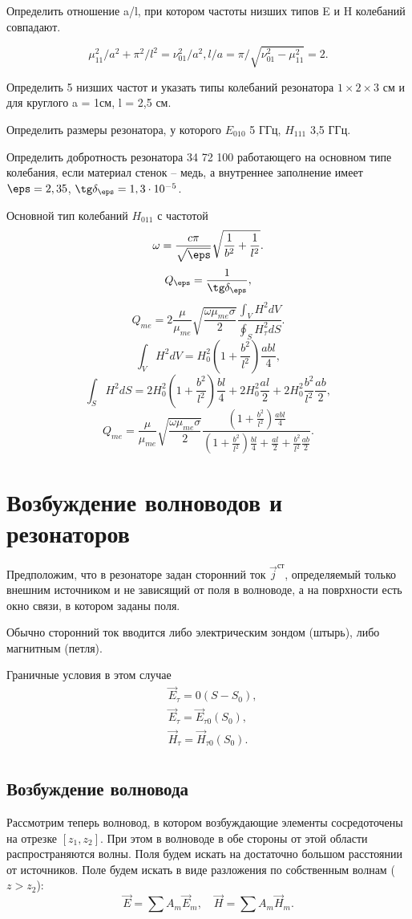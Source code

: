 Определить отношение a/l, при котором частоты низших типов E и H колебаний совпадают.

\[
	\mu_{11}^2/a^2 + \pi^2/l^2 = \nu_{01}^2/a^2, l/a = \pi/\sqrt{\nu_{01}^2 - \mu_{11}^2} = 2.
\]

Определить 5 низших частот и указать типы колебаний резонатора \(1\times2\times3\) см и для круглого a = 1см, l = 2,5 см.

Определить размеры резонатора, у которого \(E_{010}\) 5 ГГц, \(H_{111}\) 3,5 ГГц.

Определить добротность резонатора 34 72 100 работающего на основном типе колебания, если материал стенок -- медь, а внутреннее заполнение имеет \(\eps = 2,35\), \(\tg\delta_\eps = 1,3\cdot10^{-5}\).

Основной тип колебаний \( H_{011} \) с частотой
\[
	\omega = \frac{c\pi}{\sqrt{\eps}}\sqrt{\frac{1}{b^2} + \frac{1}{l^2}}.
\]
\[
	Q_\eps = \frac{1}{\tg\delta_\eps},
\]
\[
	Q_{me} = 2\frac{\mu}{\mu_{me}}\sqrt{\frac{\omega\mu_{me}\sigma}{2}}
	\frac{\int_V H^2 dV}{\oint_S H_\tau^2 dS}.
\]
\[
	\int_V H^2 dV = H_0^2\left( 1 + \frac{b^2}{l^2} \right)\frac{abl}{4},
\]
\[
	\int_S H^2 dS = 2H_0^2\left( 1 + \frac{b^2}{l^2} \right)\frac{bl}{4} +
	2H_0^2\frac{al}{2} + 2H_0^2\frac{b^2}{l^2}\frac{ab}{2},
\]
\[
	Q_{me} = \frac{\mu}{\mu_{me}}\sqrt{\frac{\omega\mu_{me}\sigma}{2}}
	\frac{\left( 1 + \frac{b^2}{l^2} \right)\frac{abl}{4}}{\left( 1 + \frac{b^2}{l^2} \right)\frac{bl}{4} + \frac{al}{2} + \frac{b^2}{l^2}\frac{ab}{2}}.
\]

\chapter{Возбуждение волноводов и резонаторов}
Предположим, что в резонаторе задан сторонний ток \( \vec{j}^\text{ст} \), определяемый только внешним источником и не зависящий от поля в волноводе, а на поврхности есть окно связи, в котором заданы поля.

Обычно сторонний ток вводится либо электрическим зондом (штырь), либо магнитным (петля).

Граничные условия в этом случае
\begin{align*}
	& \vec{E}_\tau = 0 (S - S_0),\\
	& \vec{E}_\tau = \vec{E}_{\tau0} (S_0),\\
	& \vec{H}_\tau = \vec{H}_{\tau0} (S_0).\\
\end{align*}

\section{Возбуждение волновода}
Рассмотрим теперь волновод, в котором возбуждающие элементы сосредоточены на отрезке \([z_1, z_2]\). При этом в волноводе в обе стороны от этой области распространяются волны. Поля будем искать на достаточно большом расстоянии от источников. Поле будем искать в виде разложения по собственным волнам (\( z > z_2 \)):
\[
	\vec{E} = \sum A_m\vec{E}_m,\quad \vec{H} = \sum A_m\vec{H}_m.
\]

